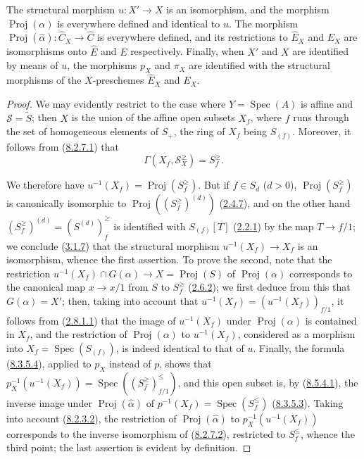 \begin{proposition}[8.6.2]
\label{II.8.6.2}
The structural morphism $u:X'\to X$ is an isomorphism, and the morphism
$\operatorname{Proj}(\alpha)$ is everywhere defined and identical to $u$. The
morphism
$\operatorname{Proj}(\widehat{\alpha}):\widehat{C}_X\to\widehat{C}$ is
everywhere defined, and its restrictions to $\widehat{E}_X$ and $E_X$ are
isomorphisms onto $\widehat{E}$ and $E$ respectively. Finally, when $X'$ and
$X$ are identified by means of $u$, the morphisms $p_X$ and $\pi_X$
are identified with the structural morphisms of the $X$-preschemes $\widehat{E}_X$ and
$E_X$.
\end{proposition}

\begin{proof}
We may evidently restrict to the case where $Y=\operatorname{Spec}(A)$ is affine
and $\mathcal{S}=\widetilde{S}$; then $X$ is the union of the affine open subsets
$X_f$, where $f$ runs through the set of homogeneous elements of $S_+$, the ring
of $X_f$ being $S_{(f)}$. Moreover, it follows from
(\hyperref[II.8.2.7.1]{8.2.7.1}) that
\begin{equation}
\label{II.8.6.2.1}
  \Gamma(X_f,\mathcal{S}_X^{\geq})=S_f^{\geq}.
\tag{8.6.2.1}
\end{equation}

We therefore have $u^{-1}(X_f)=\operatorname{Proj}(S_f^{\geq})$. But if
$f\in S_d$ ($d>0$), $\operatorname{Proj}(S_f^{\geq})$ is canonically
isomorphic to $\operatorname{Proj}((S_f^{\geq})^{(d)})$
(\hyperref[II.2.4.7]{2.4.7}), and on the other hand
$(S_f^{\geq})^{(d)}=(S^{(d)})_f^{\geq}$ is identified with $S_{(f)}[T]$
(\hyperref[II.2.2.1]{2.2.1}) by the map $T\to f/1$; we conclude
(\hyperref[II.3.1.7]{3.1.7}) that the structural morphism
$u^{-1}(X_f)\to X_f$ is an isomorphism, whence the first assertion. To
prove the second, note that the restriction
$u^{-1}(X_f)\cap G(\alpha)\to X=\operatorname{Proj}(S)$ of
$\operatorname{Proj}(\alpha)$ corresponds to the canonical map
$x\to x/1$ from $S$ to $S_f^{\geq}$
(\hyperref[II.2.6.2]{2.6.2}); we first deduce from this that
$G(\alpha)=X'$; then, taking into account that
$u^{-1}(X_f)=(u^{-1}(X_f))_{f/1}$, it follows from
(\hyperref[II.2.8.1.1]{2.8.1.1}) that the image of $u^{-1}(X_f)$ under
$\operatorname{Proj}(\alpha)$ is contained in $X_f$, and the restriction of
$\operatorname{Proj}(\alpha)$ to $u^{-1}(X_f)$, considered as a morphism
into $X_f=\operatorname{Spec}(S_{(f)})$, is indeed identical to that of $u$.
Finally, the formula (\hyperref[II.8.3.5.4]{8.3.5.4}), applied to $p_X$
instead of $p$, shows that
$p_X^{-1}(u^{-1}(X_f))=
\operatorname{Spec}((S_f^{\geq})_{f/1}^{\leq})$, and this open subset is, by
(\hyperref[II.8.5.4.1]{8.5.4.1}), the inverse image under
$\operatorname{Proj}(\widehat{\alpha})$ of
$p^{-1}(X_f)=\operatorname{Spec}(S_f^{\leq})$
(\hyperref[II.8.3.5.3]{8.3.5.3}). Taking into account
(\hyperref[II.8.2.3.2]{8.2.3.2}), the restriction of
$\operatorname{Proj}(\widehat{\alpha})$ to
$p_X^{-1}(u^{-1}(X_f))$ corresponds to the inverse isomorphism of
(\hyperref[II.8.2.7.2]{8.2.7.2}), restricted to $S_f^{\leq}$, whence the
third point; the last assertion is evident by definition.


\end{proof}

